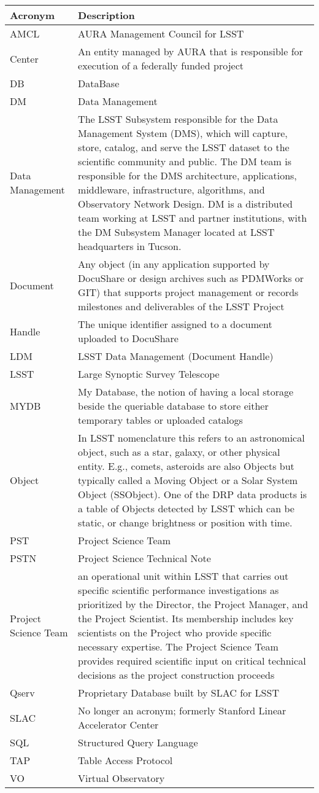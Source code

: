 \addtocounter{table}{-1}
\begin{longtable}{|l|p{}|}\hline
\textbf{Acronym} & \textbf{Description}  \\\hline

AMCL & AURA Management Council for LSST \\\hline
Center & An entity managed by AURA that is responsible for execution of a federally funded project \\\hline
DB & DataBase \\\hline
DM & Data Management \\\hline
Data Management & The LSST Subsystem responsible for the Data Management System (DMS), which will capture, store, catalog, and serve the LSST dataset to the scientific community and public. The DM team is responsible for the DMS architecture, applications, middleware, infrastructure, algorithms, and Observatory Network Design. DM is a distributed team working at LSST and partner institutions, with the DM Subsystem Manager located at LSST headquarters in Tucson. \\\hline
Document & Any object (in any application supported by DocuShare or design archives such as PDMWorks or GIT) that supports project management or records milestones and deliverables of the LSST Project \\\hline
Handle & The unique identifier assigned to a document uploaded to DocuShare \\\hline
LDM & LSST Data Management (Document Handle) \\\hline
LSST & Large Synoptic Survey Telescope \\\hline
MYDB & My Database, the notion of having a local storage beside the queriable database to store either temporary tables or uploaded catalogs \\\hline
Object & In LSST nomenclature this refers to an astronomical object, such as a star, galaxy, or other physical entity. E.g., comets, asteroids are also Objects but typically called a Moving Object or a Solar System Object (SSObject). One of the DRP data products is a table of Objects detected by LSST which can be static, or change brightness or position with time. \\\hline
PST & Project Science Team \\\hline
PSTN & Project Science Technical Note \\\hline
Project Science Team & an operational unit within LSST that carries out specific scientific performance investigations as prioritized by the Director, the Project Manager, and the Project Scientist. Its membership includes key scientists on the Project who provide specific necessary expertise. The Project Science Team provides required scientific input on critical technical decisions as the project construction proceeds \\\hline
Qserv & Proprietary Database built by SLAC for LSST \\\hline
SLAC & No longer an acronym; formerly Stanford Linear Accelerator Center \\\hline
SQL & Structured Query Language \\\hline
TAP & Table Access Protocol \\\hline
VO & Virtual Observatory \\\hline
\end{longtable}
